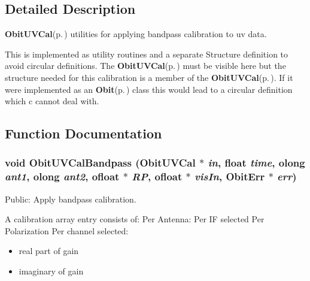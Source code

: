 \subsection{Detailed Description}
{\bf Obit\-UVCal}{\rm (p.\,\pageref{structObitUVCal})} utilities for applying bandpass calibration to uv data. 

This is implemented as utility routines and a separate Structure definition to avoid circular definitions. The {\bf Obit\-UVCal}{\rm (p.\,\pageref{structObitUVCal})} must be visible here but the structure needed for this calibration is a member of the {\bf Obit\-UVCal}{\rm (p.\,\pageref{structObitUVCal})}. If it were implemented as an {\bf Obit}{\rm (p.\,\pageref{structObit})} class this would lead to a circular definition which c cannot deal with.

\subsection{Function Documentation}
\subsubsection{\setlength{\rightskip}{0pt plus 5cm}void Obit\-UVCal\-Bandpass ({\bf Obit\-UVCal} $\ast$ {\em in}, float {\em time}, {\bf olong} {\em ant1}, {\bf olong} {\em ant2}, {\bf ofloat} $\ast$ {\em RP}, {\bf ofloat} $\ast$ {\em vis\-In}, {\bf Obit\-Err} $\ast$ {\em err})}\label{ObitUVCalBandpass_8h_a1}


Public: Apply bandpass calibration. 

A calibration array entry consists of: Per Antenna: Per IF selected Per Polarization Per channel selected: \begin{itemize}
\item real part of gain \item imaginary of gain 
\end{itemize}
